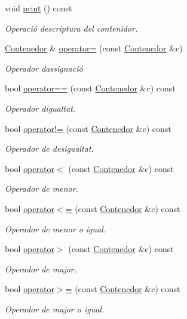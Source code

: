 \begin{DoxyCompactItemize}
void \hyperlink{class_contenedor_abcffc39995e62a9ddad113b2cfeb3279}{print} () const
\begin{DoxyCompactList}\small\item\em Operació d\textquotesingle{}escriptura del contenidor. \end{DoxyCompactList}\item 
\hyperlink{class_contenedor}{Contenedor} \& \hyperlink{class_contenedor_aa04efd3e3050940c96a9e1615156f4af}{operator=} (const \hyperlink{class_contenedor}{Contenedor} \&c)
\begin{DoxyCompactList}\small\item\em Operador d\textquotesingle{}assignació \end{DoxyCompactList}\item 
bool \hyperlink{class_contenedor_affecade7507a978e3abb5eea331a509e}{operator==} (const \hyperlink{class_contenedor}{Contenedor} \&c) const
\begin{DoxyCompactList}\small\item\em Operador d\textquotesingle{}igualtat. \end{DoxyCompactList}\item 
bool \hyperlink{class_contenedor_a740ea02e3530462a00f8a6ce18b2bf9c}{operator!=} (const \hyperlink{class_contenedor}{Contenedor} \&c) const
\begin{DoxyCompactList}\small\item\em Operador de desigualtat. \end{DoxyCompactList}\item 
bool \hyperlink{class_contenedor_a9d590c94118fcc15af16ba5a6be35d09}{operator$<$} (const \hyperlink{class_contenedor}{Contenedor} \&c) const
\begin{DoxyCompactList}\small\item\em Operador de menor. \end{DoxyCompactList}\item 
bool \hyperlink{class_contenedor_a587d437b6c6973c3b7008f579c4590a4}{operator$<$=} (const \hyperlink{class_contenedor}{Contenedor} \&c) const
\begin{DoxyCompactList}\small\item\em Operador de menor o igual. \end{DoxyCompactList}\item 
bool \hyperlink{class_contenedor_a9520b1def419e6d64e879ab5b594e3a8}{operator$>$} (const \hyperlink{class_contenedor}{Contenedor} \&c) const
\begin{DoxyCompactList}\small\item\em Operador de major. \end{DoxyCompactList}\item 
bool \hyperlink{class_contenedor_a7f95853ed98513ffc10c9213df656cfd}{operator$>$=} (const \hyperlink{class_contenedor}{Contenedor} \&c) const
\begin{DoxyCompactList}\small\item\em Operador de major o igual. \end{DoxyCompactList}\end{DoxyCompactItemize}

